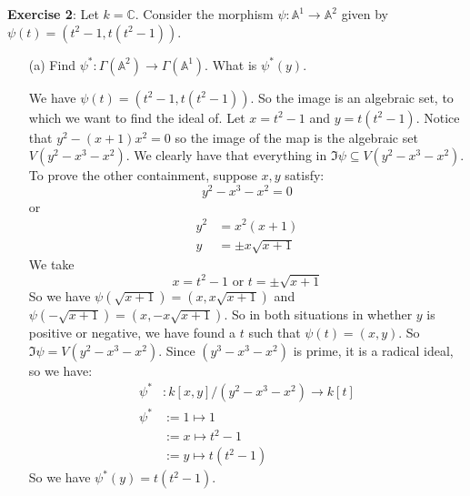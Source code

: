 \documentclass{article}
\begin{document}
\textbf{Exercise 2}: Let $k = \mathbb{C}$. Consider the morphism $\psi: \mathbb{A}^{1} \rightarrow \mathbb{A}^{2}$ given by $\psi(t) = (t^{2} - 1, t(t^{2} - 1))$. 
    \begin{itemize}
        \item [(a)] Find $\psi^{*} : \Gamma(\mathbb{A}^{2}) \rightarrow \Gamma(\mathbb{A}^{1})$. What is $\psi^{*}(y)$.
            \begin{answer}
                We have $\psi(t) = (t^{2} - 1, t(t^{2} - 1))$. So the image is an algebraic set, to which we want to find the ideal of. Let $x = t^{2} - 1$ and $y = t(t^{2} - 1)$. Notice that $y^{2} - (x + 1)x^{2} = 0$ so the image of the map is the algebraic set $V(y^{2} - x^{3} - x^{2})$. We clearly have that everything in $\Im{\psi} \subseteq V(y^{2} - x^{3} - x^{2})$. To prove the other containment, suppose $x, y$ satisfy:
                    \begin{equation*}
                        y^{2} - x^{3} - x^{2} = 0
                    \end{equation*}
                or
                    \begin{align*}
                        y^{2} &= x^{2}(x + 1) \\
                        y     &= \pm x\sqrt{x + 1}
                    \end{align*}
                We take 
                    \begin{equation*}
                        x = t^{2} - 1 \text{ or } t = \pm\sqrt{x + 1}
                    \end{equation*}
                So we have $\psi(\sqrt{x + 1}) = (x, x\sqrt{x + 1})$  and $\psi(-\sqrt{x + 1}) = (x, -x\sqrt{x + 1})$. So in both situations in whether $y$ is positive or negative, we have found a $t$ such that $\psi(t) = (x, y)$. So $\Im{\psi} = V(y^{2} - x^{3} - x^{2})$. Since $(y^{3} - x^{3} - x^{2})$ is prime, it is a radical ideal, so we have:
                    \begin{align*}
                        \psi^{*} &:  k[x, y]/(y^{2} - x^{3} - x^{2}) \rightarrow k[t] \\
                        \psi^{*} &:= 1 \mapsto 1                                      \\
                                 &:= x \mapsto t^{2} - 1                              \\
                                 &:= y \mapsto t(t^{2} - 1)                             
                    \end{align*}
                So we have $\psi^{*}(y) = t(t^{2} - 1)$.
            \end{answer}


\end{itemize}
\end{document}
